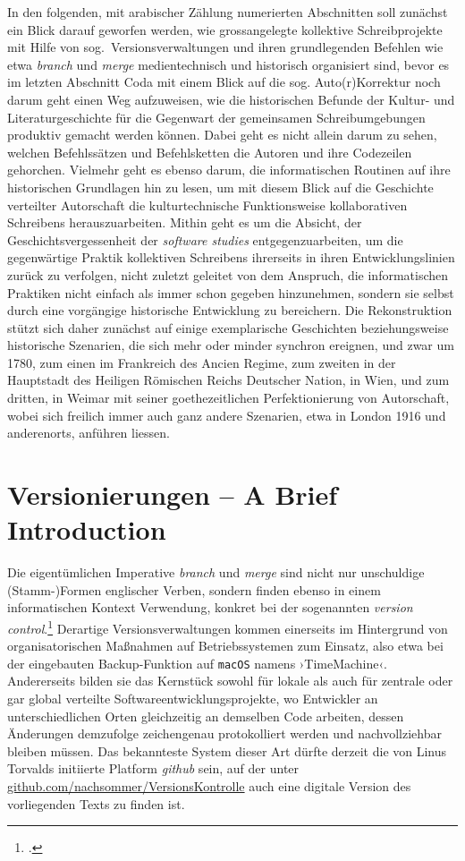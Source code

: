 \documentclass[a4paper,11pt]{article}
\newcommand{\inanf}[1]{›#1‹}
\begin{document}
In den folgenden, mit arabischer Zählung numerierten Abschnitten soll zunächst ein Blick darauf geworfen werden, wie grossangelegte kollektive Schreibprojekte mit Hilfe von sog.\ Versionsverwaltungen und ihren grundlegenden Befehlen wie etwa \emph{branch} und \emph{merge} medientechnisch und historisch organisiert sind, bevor es im letzten Abschnitt Coda mit einem Blick auf die sog. Auto(r)Korrektur noch darum geht einen Weg aufzuweisen, wie die historischen Befunde der Kultur- und Literaturgeschichte für die Gegenwart der gemeinsamen Schreibumgebungen produktiv gemacht werden können. Dabei geht es nicht allein darum zu sehen, welchen Befehlssätzen und Befehlsketten die Autoren und ihre Codezeilen gehorchen. Vielmehr geht es ebenso darum, die informatischen Routinen auf ihre historischen Grundlagen hin zu lesen, um mit diesem Blick auf die Geschichte verteilter Autorschaft die kulturtechnische Funktionsweise kollaborativen Schreibens herauszuarbeiten. Mithin geht es um die Absicht, der Geschichtsvergessenheit der \emph{software studies} entgegenzuarbeiten, um die gegenwärtige Praktik kollektiven Schreibens ihrerseits in ihren Entwicklungslinien zurück zu verfolgen, nicht zuletzt geleitet von dem Anspruch, die informatischen Praktiken nicht einfach als immer schon gegeben hinzunehmen, sondern sie selbst durch eine vorgängige historische Entwicklung zu bereichern. Die Rekonstruktion stützt sich daher zunächst auf einige exemplarische Geschichten beziehungsweise historische Szenarien, die sich mehr oder minder synchron ereignen, und zwar um 1780, zum einen im Frankreich des Ancien Regime, zum zweiten in der Hauptstadt des Heiligen Römischen Reichs Deutscher Nation, in Wien, und zum dritten, in Weimar mit seiner goethezeitlichen Perfektionierung von Autorschaft, wobei sich freilich immer auch ganz andere Szenarien, etwa in London 1916 und anderenorts, anführen liessen.


\section{Versionierungen – A Brief Introduction}


Die eigentümlichen Imperative \emph{branch} und \emph{merge} sind nicht nur unschuldige (Stamm-)Formen englischer Verben, sondern finden ebenso in einem informatischen Kontext Verwendung, konkret bei der sogenannten \emph{version control}.\footcite[Vgl.][]{yuill:2008} Derartige Versionsverwaltungen kommen einerseits im Hintergrund von organisatorischen Maßnahmen auf Betriebssystemen zum Einsatz, also etwa bei der eingebauten Backup-Funktion auf \verb+macOS+ namens \inanf{TimeMachine}. Andererseits bilden sie das Kernstück sowohl für lokale als auch für zentrale oder gar global verteilte Softwareentwicklungsprojekte, wo Entwickler an unterschiedlichen Orten gleichzeitig an demselben Code arbeiten, dessen Änderungen demzufolge zeichengenau protokolliert werden und nachvollziehbar bleiben müssen. Das bekannteste System dieser Art dürfte derzeit die von Linus Torvalds initiierte Platform \emph{github} sein, auf der unter \href{https://github.com/nachsommer/VersionsKontrolle}{github.com/nachsommer/VersionsKontrolle} auch eine digitale Version des vorliegenden Texts zu finden ist. 
\end{document}
